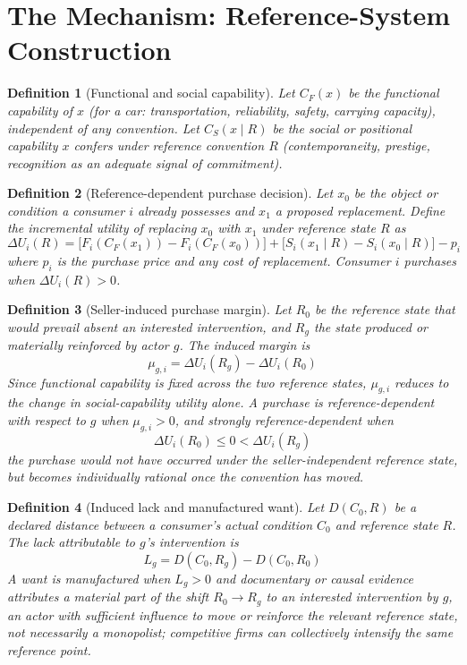 \documentclass[11pt]{article}
\newtheorem{definition}{Definition}[section]
\begin{document}
\section{The Mechanism: Reference-System Construction}

\begin{definition}[Functional and social capability]
Let $C_F(x)$ be the functional capability of $x$ (for a car: transportation, reliability, safety, carrying capacity), independent of any convention. Let $C_S(x \mid R)$ be the social or positional capability $x$ confers under reference convention $R$ (contemporaneity, prestige, recognition as an adequate signal of commitment).
\end{definition}

\begin{definition}[Reference-dependent purchase decision]
Let $x_0$ be the object or condition a consumer $i$ already possesses and $x_1$ a proposed replacement. Define the incremental utility of replacing $x_0$ with $x_1$ under reference state $R$ as
\[
\Delta U_i(R) = \big[F_i(C_F(x_1)) - F_i(C_F(x_0))\big] + \big[S_i(x_1 \mid R) - S_i(x_0 \mid R)\big] - p_i
\]
where $p_i$ is the purchase price and any cost of replacement. Consumer $i$ purchases when $\Delta U_i(R) > 0$.
\end{definition}

\begin{definition}[Seller-induced purchase margin]
Let $R_0$ be the reference state that would prevail absent an interested intervention, and $R_g$ the state produced or materially reinforced by actor $g$. The induced margin is
\[
\mu_{g,i} = \Delta U_i(R_g) - \Delta U_i(R_0)
\]
Since functional capability is fixed across the two reference states, $\mu_{g,i}$ reduces to the change in social-capability utility alone. A purchase is \emph{reference-dependent} with respect to $g$ when $\mu_{g,i} > 0$, and \emph{strongly reference-dependent} when
\[
\Delta U_i(R_0) \leq 0 < \Delta U_i(R_g)
\]
the purchase would not have occurred under the seller-independent reference state, but becomes individually rational once the convention has moved.
\end{definition}

\begin{definition}[Induced lack and manufactured want]
Let $D(C_0, R)$ be a declared distance between a consumer's actual condition $C_0$ and reference state $R$. The lack attributable to $g$'s intervention is
\[
L_g = D(C_0, R_g) - D(C_0, R_0)
\]
A want is \emph{manufactured} when $L_g > 0$ and documentary or causal evidence attributes a material part of the shift $R_0 \to R_g$ to an interested intervention by $g$, an actor with sufficient influence to move or reinforce the relevant reference state, not necessarily a monopolist; competitive firms can collectively intensify the same reference point.
\end{definition}
\end{document}
